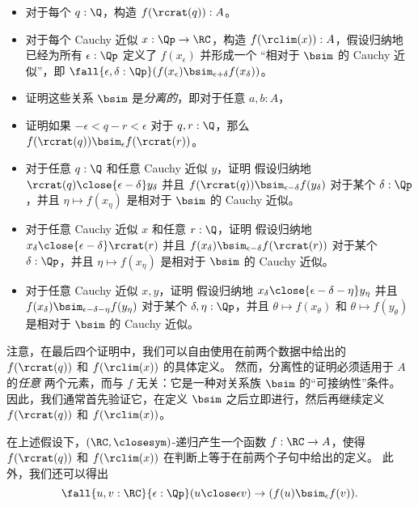 \begin{itemize}
  \item 对于每个 $q : \Q$，构造 $f(\rcrat(q)) : A$。
  \item 对于每个 Cauchy 近似 $x : \Qp \to \RC$，构造 $f(\rclim(x)) : A$，假设归纳地已经为所有 $\epsilon : \Qp$ 定义了 $f(x_\epsilon)$ 并形成一个 ``相对于 $\bsim$ 的 Cauchy 近似''，即 $\fall{\epsilon,\delta:\Qp} (f(x_\epsilon) \bsim_{\epsilon+\delta} f(x_\delta))$。
  \item 证明这些关系 $\bsim$ 是\emph{分离的}，即对于任意 $a,b:A$，
  \item 证明如果 $-\epsilon< q-r <\epsilon$ 对于 $q,r:\Q$，那么 $f(\rcrat(q))\bsim_\epsilon f(\rcrat(r))$。
  \item 对于任意 $q:\Q$ 和任意 Cauchy 近似 $y$，证明
   假设归纳地 $\rcrat(q)\close{\epsilon-\delta} y_\delta$ 并且 $f(\rcrat(q)) \bsim_{\epsilon-\delta} f(y_\delta)$ 对于某个 $\delta:\Qp$，并且 $\eta \mapsto f(x_\eta)$ 是相对于 $\bsim$ 的 Cauchy 近似。
  \item 对于任意 Cauchy 近似 $x$ 和任意 $r:\Q$，证明
  假设归纳地 $x_\delta \close{\epsilon-\delta} \rcrat(r)$ 并且 $f(x_\delta) \bsim_{\epsilon-\delta} f(\rcrat(r))$ 对于某个 $\delta:\Qp$，并且 $\eta\mapsto f(x_\eta)$ 是相对于 $\bsim$ 的 Cauchy 近似。
  \item 对于任意 Cauchy 近似 $x,y$，证明
  假设归纳地 $x_\delta \close{\epsilon-\delta-\eta} y_\eta$ 并且 $f(x_\delta) \bsim_{\epsilon-\delta-\eta} f(y_\eta)$ 对于某个 $\delta,\eta:\Qp$，并且 $\theta\mapsto f(x_\theta)$ 和 $\theta\mapsto f(y_\theta)$ 是相对于 $\bsim$ 的 Cauchy 近似。
\end{itemize}
注意，在最后四个证明中，我们可以自由使用在前两个数据中给出的 $f(\rcrat(q))$ 和 $f(\rclim(x))$ 的具体定义。
然而，分离性的证明必须适用于 $A$ 的\emph{任意} 两个元素，而与 $f$ 无关：它是一种对关系族 $\bsim$ 的``可接纳性''条件。
因此，我们通常首先验证它，在定义 $\bsim$ 之后立即进行，然后再继续定义 $f(\rcrat(q))$ 和 $f(\rclim(x))$。

在上述假设下，$(\RC,\closesym)$-递归产生一个函数 $f:\RC\to A$，使得 $f(\rcrat(q))$ 和 $f(\rclim(x))$ 在判断上等于在前两个子句中给出的定义。
此外，我们还可以得出
\begin{equation}
  \fall{u,v:\RC}{\epsilon:\Qp} (u\close\epsilon v) \to (f(u) \bsim_\epsilon f(v)).\label{eq:RC-sim-recursion-extra}
\end{equation}


